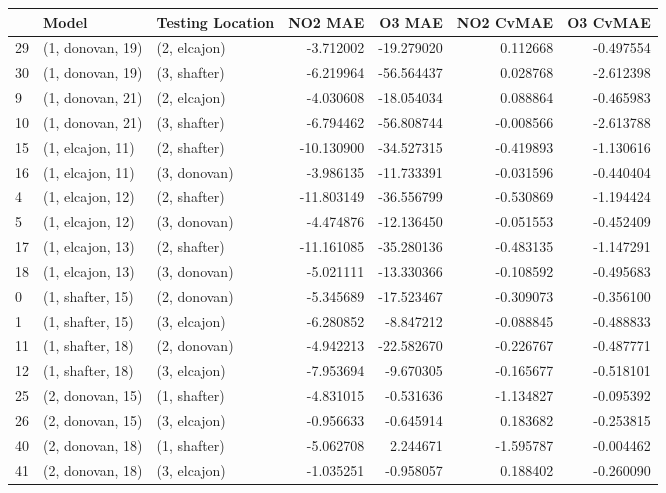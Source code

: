 \begin{tabular}{lllrrrr}
\toprule
{} &             Model & Testing Location &    NO2 MAE &     O3 MAE &  NO2 CvMAE &  O3 CvMAE \\
\midrule
29 &  (1, donovan, 19) &     (2, elcajon) &  -3.712002 & -19.279020 &   0.112668 & -0.497554 \\
30 &  (1, donovan, 19) &     (3, shafter) &  -6.219964 & -56.564437 &   0.028768 & -2.612398 \\
9  &  (1, donovan, 21) &     (2, elcajon) &  -4.030608 & -18.054034 &   0.088864 & -0.465983 \\
10 &  (1, donovan, 21) &     (3, shafter) &  -6.794462 & -56.808744 &  -0.008566 & -2.613788 \\
15 &  (1, elcajon, 11) &     (2, shafter) & -10.130900 & -34.527315 &  -0.419893 & -1.130616 \\
16 &  (1, elcajon, 11) &     (3, donovan) &  -3.986135 & -11.733391 &  -0.031596 & -0.440404 \\
4  &  (1, elcajon, 12) &     (2, shafter) & -11.803149 & -36.556799 &  -0.530869 & -1.194424 \\
5  &  (1, elcajon, 12) &     (3, donovan) &  -4.474876 & -12.136450 &  -0.051553 & -0.452409 \\
17 &  (1, elcajon, 13) &     (2, shafter) & -11.161085 & -35.280136 &  -0.483135 & -1.147291 \\
18 &  (1, elcajon, 13) &     (3, donovan) &  -5.021111 & -13.330366 &  -0.108592 & -0.495683 \\
0  &  (1, shafter, 15) &     (2, donovan) &  -5.345689 & -17.523467 &  -0.309073 & -0.356100 \\
1  &  (1, shafter, 15) &     (3, elcajon) &  -6.280852 &  -8.847212 &  -0.088845 & -0.488833 \\
11 &  (1, shafter, 18) &     (2, donovan) &  -4.942213 & -22.582670 &  -0.226767 & -0.487771 \\
12 &  (1, shafter, 18) &     (3, elcajon) &  -7.953694 &  -9.670305 &  -0.165677 & -0.518101 \\
25 &  (2, donovan, 15) &     (1, shafter) &  -4.831015 &  -0.531636 &  -1.134827 & -0.095392 \\
26 &  (2, donovan, 15) &     (3, elcajon) &  -0.956633 &  -0.645914 &   0.183682 & -0.253815 \\
40 &  (2, donovan, 18) &     (1, shafter) &  -5.062708 &   2.244671 &  -1.595787 & -0.004462 \\
41 &  (2, donovan, 18) &     (3, elcajon) &  -1.035251 &  -0.958057 &   0.188402 & -0.260090 \\

\end{tabular}
